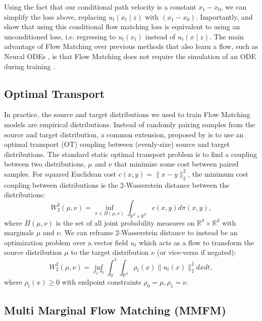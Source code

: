 Using the fact that our conditional path velocity is a constant $x_1-x_0$, we can simplify the loss above, replacing $u_t(x_t\mid z)$ with $(x_1-x_0)$. Importantly, \citet{lipmanFlowMatchingGenerative2023} and \citet{tongImprovingGeneralizingFlowbased2024} show that using this conditional flow matching loss is equivalent to using an unconditioned loss, i.e. regressing to $u_t(x_t)$ instead of $u_t(x\mid z)$. The main advantage of Flow Matching over previous methods that also learn a flow, such as Neural ODEs , is that Flow Matching does not require the simulation of an ODE during training \cite{lipmanFlowMatchingGuide2024}.

\subsection{Optimal Transport}
In practice, the source and target distributions we used to train Flow Matching models are empirical distributions. Instead of randomly pairing samples from the source and target distribution, a common extension, proposed by \citet{tongImprovingGeneralizingFlowbased2024} is to use an optimal transport (OT) coupling between (evenly-size) source and target distributions. The standard static optimal transport problem is to find a coupling between two distributions, $\mu$ and $\nu$ that minimize some cost between paired samples. For squared Euclidean cost $c(x,y)=\|x-y\|_2^2$, the minimum cost coupling between distributions is the 2-Wasserstein distance between the distributions:
\begin{equation}
    W^2_2(\mu,\nu)=\inf_{\pi\in \Pi(\mu,\nu)}\int_{\mathbb R^d \times \mathbb R^d}c(x,y)d\pi(x,y),
    \label{eq:static_ot}
\end{equation}
where $\Pi(\mu,\nu)$ is the set of all joint probability measures on $\mathbb R^d\times \mathbb R^d$ with marginals $\mu$ and $\nu$.
We can reframe 2-Wasserstein distance to instead be an optimization problem over a vector field $u_t$ which acts as a flow to transform the source distribution $\mu$ to the target distribution $\nu$ (or vice-versa if negated):
\begin{equation}
    W_2^2(\mu, \nu)=\inf_{\rho_t,u_t}\int_0^1\int_{\mathbb R^d}\rho_t(x)\|u_t(x)\|_2^2dxdt,
    \label{eq:dynamic_ot}
\end{equation}
where $\rho_t(x)\ge 0$ with endpoint constraints $\rho_0=\mu,\rho_1=\nu$.

\subsection{Multi Marginal Flow Matching (MMFM)}

